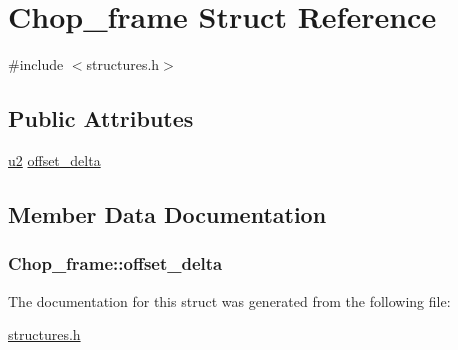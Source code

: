 \hypertarget{structChop__frame}{}\section{Chop\+\_\+frame Struct Reference}
\label{structChop__frame}


{\ttfamily \#include $<$structures.\+h$>$}

\subsection*{Public Attributes}
\begin{DoxyCompactItemize}
\item 
\hyperlink{structures_8h_a55ef8d87fd202b8417704c089899c5b9}{u2} \hyperlink{structChop__frame_ae9ef25b530d108a044102edff5909cf4}{offset\+\_\+delta}
\end{DoxyCompactItemize}


\subsection{Member Data Documentation}
\subsubsection[{\texorpdfstring{offset\+\_\+delta}{offset_delta}}]{ Chop\+\_\+frame\+::offset\+\_\+delta}\hypertarget{structChop__frame_ae9ef25b530d108a044102edff5909cf4}{}\label{structChop__frame_ae9ef25b530d108a044102edff5909cf4}


The documentation for this struct was generated from the following file\+:\begin{DoxyCompactItemize}
\item 
\hyperlink{structures_8h}{structures.\+h}\end{DoxyCompactItemize}
